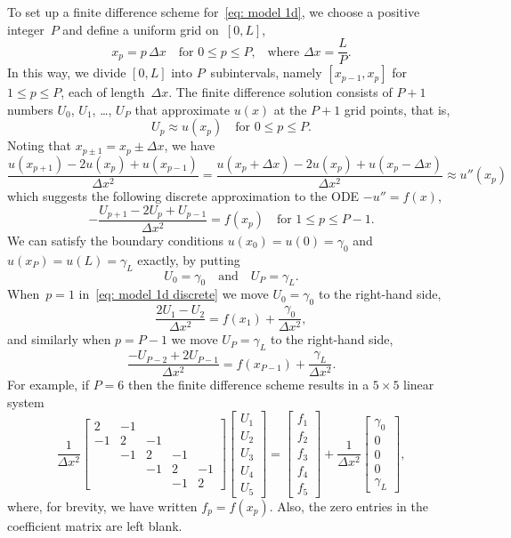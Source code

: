 To set up a finite difference scheme for~\eqref{eq: model 1d}, we choose a 
positive integer~$P$ and define a uniform grid on~$[0,L]$,
\[
x_p=p\,\Delta x\quad\text{for $0\le p\le P$,}
	\quad\text{where $\Delta x=\frac{L}{P}$.}
\]
In this way, we divide $[0,L]$ into $P$~subintervals, namely $[x_{p-1},x_p]$
for~$1\le p\le P$, each of length~$\Delta x$.  The finite difference solution 
consists of $P+1$ numbers $U_0$, $U_1$, \dots, $U_P$ that approximate $u(x)$ at 
the $P+1$ grid points, that is,
\[
U_p\approx u(x_p)\quad\text{for $0\le p\le P$.}
\]
Noting that $x_{p\pm1}=x_p\pm\Delta x$, we have
\begin{equation}\label{eq: u'' approx}
\frac{u(x_{p+1})-2u(x_p)+u(x_{p-1})}{\Delta x^2}
	=\frac{u(x_p+\Delta x)-2u(x_p)+u(x_p-\Delta x)}{\Delta x^2}
	\approx u''(x_p)
\end{equation}
which suggests the following discrete approximation to the ODE $-u''=f(x)$,
\begin{equation}\label{eq: model 1d discrete}
-\frac{U_{p+1}-2U_p+U_{p-1}}{\Delta x^2}=f(x_p)\quad\text{for $1\le p\le P-1$.}
\end{equation}
We can satisfy the boundary conditions $u(x_0)=u(0)=\gamma_0$ and 
$u(x_P)=u(L)=\gamma_L$ exactly, by putting
\[
U_0=\gamma_0\quad\text{and}\quad U_P=\gamma_L.
\]
When~$p=1$ in~\eqref{eq: model 1d discrete} we move $U_0=\gamma_0$ to the 
right-hand side, 
\[
\frac{2U_1-U_2}{\Delta x^2}=f(x_1)+\frac{\gamma_0}{\Delta x^2},
\]
and similarly when $p=P-1$ we move $U_P=\gamma_L$ to the right-hand side,
\[
\frac{-U_{P-2}+2U_{P-1}}{\Delta x^2}=f(x_{P-1})+\frac{\gamma_L}{\Delta x^2}.
\]
For example, if $P=6$ then the finite difference scheme results in a $5\times5$ 
linear system
\begin{equation}\label{eq: model 1d linear system}
\frac{1}{\Delta x^2}\begin{bmatrix}
 2&-1&  & &\\
-1& 2&-1& &\\
  &-1& 2&-1&\\
  &  &-1& 2&-1\\
  &  &  &-1& 2
\end{bmatrix}
\begin{bmatrix}U_1\\ U_2\\ U_3\\ U_4\\ U_5\end{bmatrix}
=\begin{bmatrix}f_1\\ f_2\\ f_3\\ f_4\\ f_5 \end{bmatrix}
+\frac{1}{\Delta x^2}
\begin{bmatrix}\gamma_0\\ 0\\ 0 \\ 0\\ \gamma_L \end{bmatrix},
\end{equation}
where, for brevity, we have written $f_p=f(x_p)$.  Also, the zero entries in 
the coefficient matrix are left blank.

